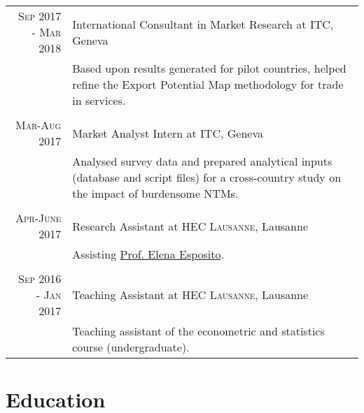 \documentclass[a4paper,10pt]{article} %
\begin{document}
\begin{tabular}{r|p{11cm}}

\textsc{Sep 2017 - Mar 2018} & International Consultant in Market Research at \textsc{ITC}, Geneva \emph{}\\
& \footnotesize{Based upon results generated for pilot countries, helped refine the Export Potential Map methodology for trade in services.}\\
\multicolumn{2}{c}{} \\


\textsc{Mar-Aug 2017} & Market Analyst Intern at \textsc{ITC}, Geneva \emph{}\\
& \footnotesize{Analysed survey data and prepared analytical inputs (database and script files) for a cross-country study on the impact of burdensome NTMs.} \\
\multicolumn{2}{c}{} \\


\textsc{Apr-June 2017} & Research Assistant at \textsc{HEC Lausanne}, Lausanne \emph{}\\
& \footnotesize{Assisting \href{http://mwpweb.eu/ElenaEsposito/}{Prof. Elena Esposito}.} \\
\multicolumn{2}{c}{} \\


\textsc{Sep 2016 - Jan 2017} & Teaching Assistant at \textsc{HEC Lausanne}, Lausanne \emph{}\\
& \footnotesize{Teaching assistant of the econometric and statistics course (undergraduate).} 
\end{tabular}


\section{\textcolor{bluegray}{Education}}
\end{document}
